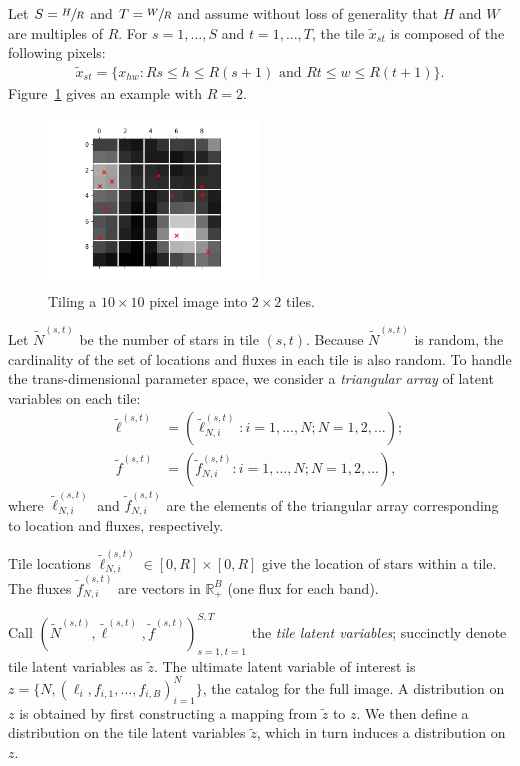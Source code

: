 Let $S = \sfrac{H}{R}$ and $T = \sfrac{W}{R}$ and assume without loss of generality that $H$ and $W$ are multiples of $R$.
For $s = 1, ..., S$ and $t = 1, ..., T$,
the tile $\tilde x_{st}$ is composed of the following pixels:
\begin{align}
    \tilde x_{st} = \{x_{hw} : Rs \leq h \leq R(s+1) \text{ and } Rt \leq w \leq R(t+1)\}.
    \label{eq:tiles}
\end{align}
Figure~\ref{fig:ex_tiles} gives an example with $R = 2$. 
\begin{figure}[!h]
    \centering
    \includegraphics[width = 0.5\textwidth]{figures/vi_figures/example_tiled.png}
    \vspace{-1cm}
    \caption{Tiling a $10 \times 10$ pixel image into $2 \times 2$ tiles.}
    \label{fig:ex_tiles}
\end{figure}

Let $\tilde N^{(s, t)}$ be the number of stars in tile 
$(s,t)$.
Because $\tilde N^{(s, t)}$ is random, 
the cardinality of the set of locations and fluxes in each tile
is also random. 
To handle the trans-dimensional parameter space, 
we consider a {\itshape triangular array} of latent variables
on each tile:
\begin{align}
    \tilde\ell^{(s, t)} &= (\tilde\ell_{N, i}^{(s, t)} : i = 1, ..., N; N = 1, 2, ...); \\
    \tilde f^{(s, t)} &= (\tilde f_{N, i}^{(s, t)} : i = 1, ..., N; N = 1, 2, ...),
\end{align}
where $\tilde\ell_{N, i}^{(s, t)}$ and $\tilde f_{N, i}^{(s, t)}$ are the elements of the triangular array corresponding to location and fluxes, respectively. 

Tile locations $\tilde\ell_{N, i}^{(s, t)} \in [0, R]\times[0, R]$ give the location of stars within a tile. The fluxes $\tilde f_{N, i}^{(s, t)}$ are vectors in $\mathbb{R}^B_+$ (one flux for each band). 

Call $(\tilde N^{(s, t)}, \tilde \ell^{(s, t)}, \tilde f^{(s, t)})_{s=1,t=1}^{S,T}$ the {\itshape tile latent variables}; 
succinctly denote tile latent variables as $\tilde z$. 
The ultimate latent variable of interest is $z = \{N, (\ell_i, f_{i,1}, ..., f_{i,B})_{i = 1}^N\}$, the catalog for the full image. 
A distribution on $z$ is obtained by first constructing a mapping from $\tilde z$ to $z$.
We then define a distribution 
on the tile latent variables $\tilde z$, which in turn  induces 
a distribution on $z$.  


